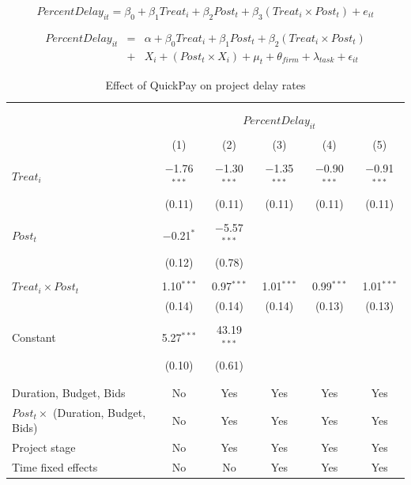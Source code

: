 \documentclass[
]{article}
\begin{document}
\[ PercentDelay_{it} = \beta_0 + \beta_1 Treat_i + \beta_2 Post_t + \beta_3 (Treat_i \times Post_t) + e_{it}\]

\[ \begin{aligned} PercentDelay_{it} &=& \alpha+\beta_0 Treat_i + \beta_1 Post_t + \beta_2 (Treat_i \times Post_t)\\
&+&  X_i + (Post_t \times X_i) + \mu_t + \theta_{firm} + \lambda_{task}+ \epsilon_{it}
\end{aligned}\]

\begin{table}[H] \centering 
  \caption{Effect of QuickPay on project delay rates} 
  \label{} 
\small 
\begin{tabular}{@{\extracolsep{-2pt}}lccccc} 
\\[-1.8ex]\hline 
\hline \\[-1.8ex] 
\\[-1.8ex] & \multicolumn{5}{c}{$PercentDelay_{it}$} \\ 
\\[-1.8ex] & (1) & (2) & (3) & (4) & (5)\\ 
\hline \\[-1.8ex] 
 $Treat_i$ & $-$1.76$^{***}$ & $-$1.30$^{***}$ & $-$1.35$^{***}$ & $-$0.90$^{***}$ & $-$0.91$^{***}$ \\ 
  & (0.11) & (0.11) & (0.11) & (0.11) & (0.11) \\ 
  & & & & & \\ 
 $Post_t$ & $-$0.21$^{*}$ & $-$5.57$^{***}$ &  &  &  \\ 
  & (0.12) & (0.78) &  &  &  \\ 
  & & & & & \\ 
 $Treat_i \times Post_t$ & 1.10$^{***}$ & 0.97$^{***}$ & 1.01$^{***}$ & 0.99$^{***}$ & 1.01$^{***}$ \\ 
  & (0.14) & (0.14) & (0.14) & (0.13) & (0.13) \\ 
  & & & & & \\ 
 Constant & 5.27$^{***}$ & 43.19$^{***}$ &  &  &  \\ 
  & (0.10) & (0.61) &  &  &  \\ 
  & & & & & \\ 
\hline \\[-1.8ex] 
Duration, Budget, Bids & No & Yes & Yes & Yes & Yes \\ 
$Post_t \times$  (Duration, Budget, Bids) & No & Yes & Yes & Yes & Yes \\ 
Project stage & No & Yes & Yes & Yes & Yes \\ 
Time fixed effects & No & No & Yes & Yes & Yes \\ 

\end{tabular}
\end{table}
\end{document}

